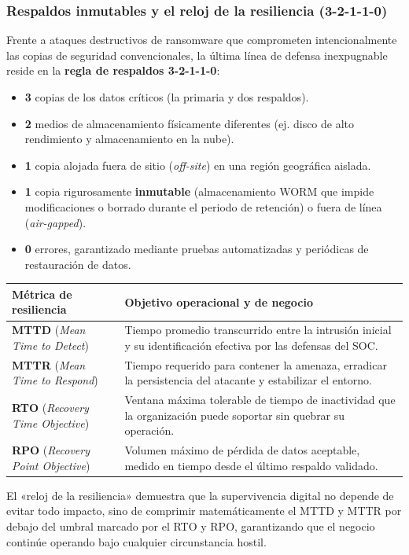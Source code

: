 \subsubsection*{\textcolor{unabblue}{}\quad Respaldos inmutables y el reloj de la resiliencia (3-2-1-1-0)}
Frente a ataques destructivos de ransomware que comprometen intencionalmente las copias de seguridad convencionales, la última línea de defensa inexpugnable reside en la \textbf{regla de respaldos 3-2-1-1-0}:
\begin{itemize}
  \item \textbf{3} copias de los datos críticos (la primaria y dos respaldos).
  \item \textbf{2} medios de almacenamiento físicamente diferentes (ej. disco de alto rendimiento y almacenamiento en la nube).
  \item \textbf{1} copia alojada fuera de sitio (\textit{off-site}) en una región geográfica aislada.
  \item \textbf{1} copia rigurosamente \textbf{inmutable} (almacenamiento WORM que impide modificaciones o borrado durante el periodo de retención) o fuera de línea (\textit{air-gapped}).
  \item \textbf{0} errores, garantizado mediante pruebas automatizadas y periódicas de restauración de datos.
\end{itemize}

\begin{center}
\begingroup
\small
\renewcommand{\arraystretch}{1.25}
\begin{tabularx}{\linewidth}{@{}>{\raggedright\arraybackslash}p{3.2cm}X@{}}
\toprule
\textbf{Métrica de resiliencia} & \textbf{Objetivo operacional y de negocio} \\
\midrule
\textbf{MTTD} (\textit{Mean Time to Detect}) & Tiempo promedio transcurrido entre la intrusión inicial y su identificación efectiva por las defensas del SOC. \\
\textbf{MTTR} (\textit{Mean Time to Respond}) & Tiempo requerido para contener la amenaza, erradicar la persistencia del atacante y estabilizar el entorno. \\
\textbf{RTO} (\textit{Recovery Time Objective}) & Ventana máxima tolerable de tiempo de inactividad que la organización puede soportar sin quebrar su operación. \\
\textbf{RPO} (\textit{Recovery Point Objective}) & Volumen máximo de pérdida de datos aceptable, medido en tiempo desde el último respaldo validado. \\
\bottomrule
\end{tabularx}
\endgroup
\end{center}

El «reloj de la resiliencia» demuestra que la supervivencia digital no depende de evitar todo impacto, sino de comprimir matemáticamente el MTTD y MTTR por debajo del umbral marcado por el RTO y RPO, garantizando que el negocio continúe operando bajo cualquier circunstancia hostil.
